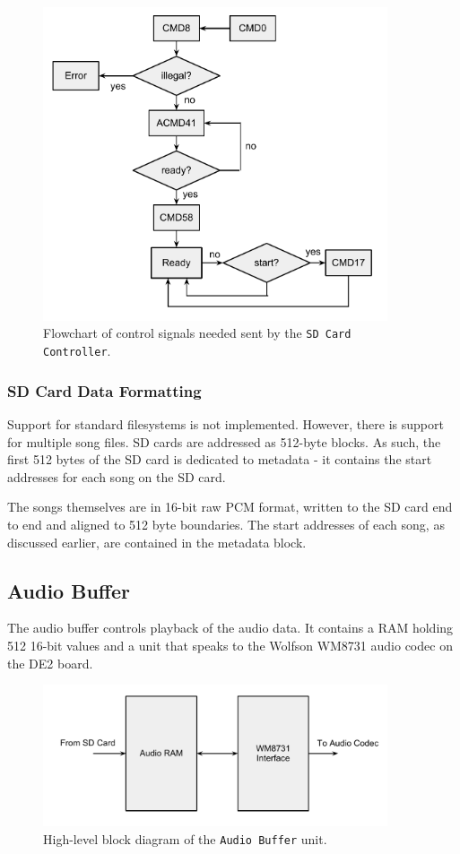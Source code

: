 \documentclass{article}
\begin{document}
\begin{figure}[H]
	\centering
	\includegraphics[width=4in]{sd-controller}
	\caption{Flowchart of control signals needed sent by the \texttt{SD Card Controller}. }
\end{figure}

\subsubsection{SD Card Data Formatting}

Support for standard filesystems is not implemented. However, there is support
for multiple song files. SD cards are addressed as 512-byte blocks. As such,
the first 512 bytes of the SD card is dedicated to metadata - it contains the
start addresses for each song on the SD card.

The songs themselves are in 16-bit raw PCM format, written to the SD card end
to end and aligned to 512 byte boundaries. The start addresses of each
song, as discussed earlier, are contained in the metadata block.

\subsection{Audio Buffer}

The audio buffer controls playback of the audio data. It contains a RAM
holding 512 16-bit values and a unit that speaks to the Wolfson WM8731
audio codec on the DE2 board.

\begin{figure}[H]
	\centering
	\includegraphics[width=4in]{audio-buffer}
	\caption{High-level block diagram of the \texttt{Audio Buffer} unit.}
\end{figure}
\end{document}
